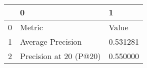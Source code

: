 \begin{tabular}{lll}
\toprule
 & 0 & 1 \\
\midrule
0 & Metric & Value \\
1 & Average Precision & 0.531281 \\
2 & Precision at 20 (P@20) & 0.550000 \\
\bottomrule
\end{tabular}
